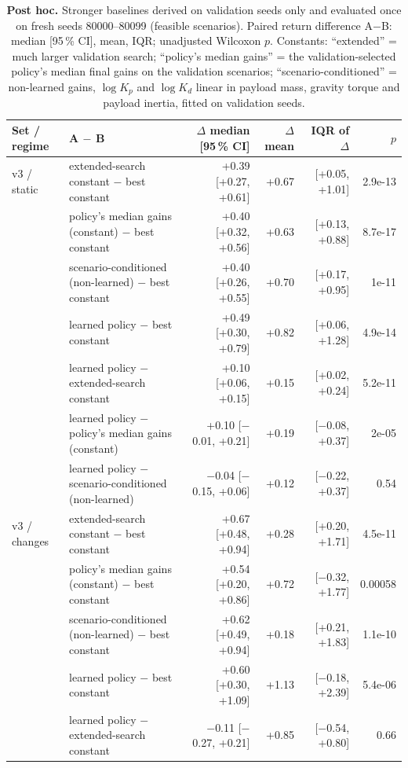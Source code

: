 \begin{table}[t]
\centering
\small
\caption{\textbf{Post hoc.} Stronger baselines derived on validation seeds only and evaluated once on fresh seeds 80000--80099 (feasible scenarios). Paired return difference A$-$B: median [95\,\% CI], mean, IQR; unadjusted Wilcoxon $p$. Constants: ``extended'' = much larger validation search; ``policy's median gains'' = the validation-selected policy's median final gains on the validation scenarios; ``scenario-conditioned'' = non-learned gains, $\log K_p$ and $\log K_d$ linear in payload mass, gravity torque and payload inertia, fitted on validation seeds.}
\label{tab:sensitivity}
\begin{tabular}{llrrrr}
\toprule
Set / regime & A $-$ B & $\Delta$ median [95\,\% CI] & $\Delta$ mean & IQR of $\Delta$ & $p$\\
\midrule
v3 / static & extended-search constant $-$ best constant & +0.39 [+0.27, +0.61] & +0.67 & [+0.05, +1.01] & 2.9e-13\\
 & policy's median gains (constant) $-$ best constant & +0.40 [+0.32, +0.56] & +0.63 & [+0.13, +0.88] & 8.7e-17\\
 & scenario-conditioned (non-learned) $-$ best constant & +0.40 [+0.26, +0.55] & +0.70 & [+0.17, +0.95] & 1e-11\\
 & learned policy $-$ best constant & +0.49 [+0.30, +0.79] & +0.82 & [+0.06, +1.28] & 4.9e-14\\
 & learned policy $-$ extended-search constant & +0.10 [+0.06, +0.15] & +0.15 & [+0.02, +0.24] & 5.2e-11\\
 & learned policy $-$ policy's median gains (constant) & +0.10 [$-$0.01, +0.21] & +0.19 & [$-$0.08, +0.37] & 2e-05\\
 & learned policy $-$ scenario-conditioned (non-learned) & $-$0.04 [$-$0.15, +0.06] & +0.12 & [$-$0.22, +0.37] & 0.54\\
\midrule
v3 / changes & extended-search constant $-$ best constant & +0.67 [+0.48, +0.94] & +0.28 & [+0.20, +1.71] & 4.5e-11\\
 & policy's median gains (constant) $-$ best constant & +0.54 [+0.20, +0.86] & +0.72 & [$-$0.32, +1.77] & 0.00058\\
 & scenario-conditioned (non-learned) $-$ best constant & +0.62 [+0.49, +0.94] & +0.18 & [+0.21, +1.83] & 1.1e-10\\
 & learned policy $-$ best constant & +0.60 [+0.30, +1.09] & +1.13 & [$-$0.18, +2.39] & 5.4e-06\\
 & learned policy $-$ extended-search constant & $-$0.11 [$-$0.27, +0.21] & +0.85 & [$-$0.54, +0.80] & 0.66\\

\end{tabular}
\end{table}
